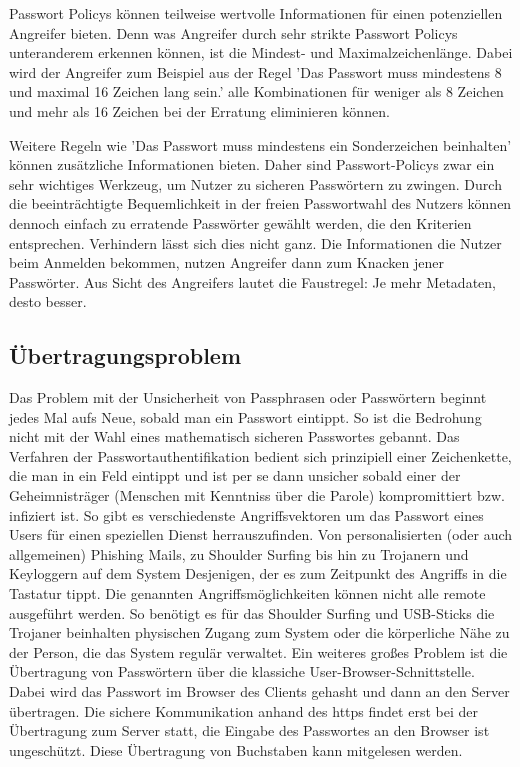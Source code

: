 Passwort Policys können teilweise wertvolle Informationen für einen potenziellen Angreifer bieten. Denn was Angreifer durch sehr strikte Passwort Policys unteranderem erkennen können, ist die Mindest- und Maximalzeichenlänge. Dabei wird der Angreifer zum Beispiel aus der Regel 'Das Passwort muss mindestens 8 und maximal 16 Zeichen lang sein.' alle Kombinationen für weniger als 8 Zeichen und mehr als 16 Zeichen bei der Erratung eliminieren können.
\newpage

Weitere Regeln wie 'Das Passwort muss mindestens ein Sonderzeichen beinhalten' können zusätzliche Informationen bieten. Daher sind Passwort-Policys zwar ein sehr wichtiges Werkzeug, um Nutzer zu sicheren Passwörtern zu zwingen. Durch die beeinträchtigte Bequemlichkeit in der freien Passwortwahl des Nutzers können dennoch einfach zu erratende Passwörter gewählt werden, die den Kriterien entsprechen. Verhindern lässt sich dies nicht ganz. Die Informationen die Nutzer beim Anmelden bekommen, nutzen Angreifer dann zum Knacken jener Passwörter. Aus Sicht des Angreifers lautet die Faustregel: Je mehr Metadaten, desto besser.
\newpage

\subsection{Übertragungsproblem}
Das Problem mit der Unsicherheit von Passphrasen oder Passwörtern beginnt jedes Mal aufs Neue, sobald man ein Passwort eintippt. So ist die Bedrohung nicht mit der Wahl eines mathematisch sicheren Passwortes gebannt. Das Verfahren der Passwortauthentifikation bedient sich prinzipiell einer Zeichenkette, die man in ein Feld eintippt und ist per se dann unsicher sobald einer der Geheimnisträger (Menschen mit Kenntniss über die Parole) kompromittiert bzw. infiziert ist. So gibt es verschiedenste Angriffsvektoren um das Passwort eines Users für einen speziellen Dienst herrauszufinden. Von personalisierten (oder auch allgemeinen) Phishing Mails, zu Shoulder Surfing bis hin zu Trojanern und Keyloggern auf dem System Desjenigen, der es zum Zeitpunkt des Angriffs in die Tastatur tippt. Die genannten Angriffsmöglichkeiten können nicht alle remote ausgeführt werden. So benötigt es für das Shoulder Surfing und USB-Sticks die Trojaner beinhalten physischen Zugang zum System oder die körperliche Nähe zu der Person, die das System regulär verwaltet. Ein weiteres großes Problem ist die Übertragung von Passwörtern über die klassiche User-Browser-Schnittstelle. Dabei wird das Passwort im Browser des Clients gehasht und dann an den Server übertragen. Die sichere Kommunikation anhand des \ac{https} findet erst bei der Übertragung zum Server statt, die Eingabe des Passwortes an den Browser ist ungeschützt. Diese Übertragung von Buchstaben kann mitgelesen werden.

